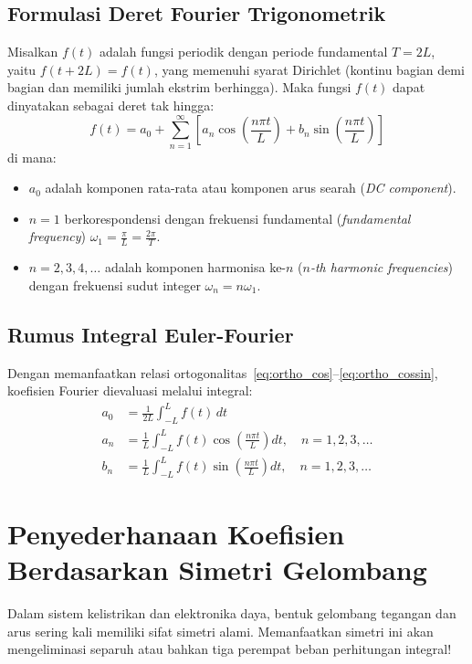 \documentclass[11pt,a4paper]{article}
\theoremstyle{definition}
\begin{document}
\subsection{Formulasi Deret Fourier Trigonometrik}
Misalkan $f(t)$ adalah fungsi periodik dengan periode fundamental $T = 2L$, yaitu $f(t + 2L) = f(t)$, yang memenuhi syarat Dirichlet (kontinu bagian demi bagian dan memiliki jumlah ekstrim berhingga). Maka fungsi $f(t)$ dapat dinyatakan sebagai deret tak hingga:
\begin{equation}
    f(t) = a_0 + \sum_{n=1}^{\infty} \left[ a_n \cos\left(\frac{n\pi t}{L}\right) + b_n \sin\left(\frac{n\pi t}{L}\right) \right]
    \label{eq:fourier_series}
\end{equation}
di mana:
\begin{itemize}[leftmargin=*]
    \item $a_0$ adalah komponen rata-rata atau komponen arus searah (\textit{DC component}).
    \item $n = 1$ berkorespondensi dengan frekuensi fundamental (\textit{fundamental frequency}) $\omega_1 = \frac{\pi}{L} = \frac{2\pi}{T}$.
    \item $n = 2, 3, 4, \dots$ adalah komponen harmonisa ke-$n$ (\textit{$n$-th harmonic frequencies}) dengan frekuensi sudut integer $\omega_n = n \omega_1$.
\end{itemize}

\subsection{Rumus Integral Euler-Fourier}
Dengan memanfaatkan relasi ortogonalitas~\eqref{eq:ortho_cos}--\eqref{eq:ortho_cossin}, koefisien Fourier dievaluasi melalui integral:
\begin{align}
    a_0 &= \frac{1}{2L} \int_{-L}^{L} f(t) \, dt \label{eq:a0_formula} \\
    a_n &= \frac{1}{L} \int_{-L}^{L} f(t) \cos\left(\frac{n\pi t}{L}\right) dt, \quad n = 1, 2, 3, \dots \label{eq:an_formula} \\
    b_n &= \frac{1}{L} \int_{-L}^{L} f(t) \sin\left(\frac{n\pi t}{L}\right) dt, \quad n = 1, 2, 3, \dots \label{eq:bn_formula}
\end{align}

\section{Penyederhanaan Koefisien Berdasarkan Simetri Gelombang}

Dalam sistem kelistrikan dan elektronika daya, bentuk gelombang tegangan dan arus sering kali memiliki sifat simetri alami. Memanfaatkan simetri ini akan mengeliminasi separuh atau bahkan tiga perempat beban perhitungan integral!
\end{document}
